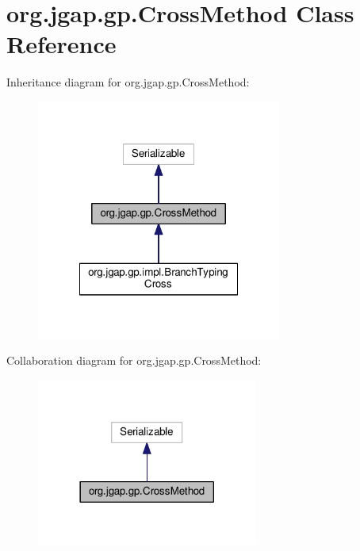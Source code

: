 \hypertarget{classorg_1_1jgap_1_1gp_1_1_cross_method}{\section{org.\-jgap.\-gp.\-Cross\-Method Class Reference}
\label{classorg_1_1jgap_1_1gp_1_1_cross_method}
}


Inheritance diagram for org.\-jgap.\-gp.\-Cross\-Method\-:
\nopagebreak
\begin{figure}[H]
\begin{center}
\leavevmode
\includegraphics[width=228pt]{classorg_1_1jgap_1_1gp_1_1_cross_method__inherit__graph}
\end{center}
\end{figure}


Collaboration diagram for org.\-jgap.\-gp.\-Cross\-Method\-:
\nopagebreak
\begin{figure}[H]
\begin{center}
\leavevmode
\includegraphics[width=206pt]{classorg_1_1jgap_1_1gp_1_1_cross_method__coll__graph}
\end{center}
\end{figure}
